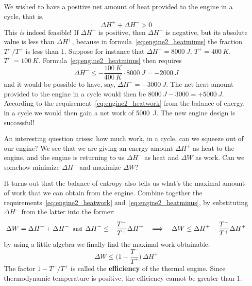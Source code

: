 \documentclass[a4paper,12pt,%
onecolumn,oneside,titlepage,%
british%
]{memoir}
\newcommand*{\incr}{\Delta}%
\renewcommand*{\|}[1][]{\nonscript\:#1\vert\nonscript\:\mathopen{}}
\newcommand*{\yhep}{\incr H^{+}}%
\newcommand*{\yhem}{\incr H^{-}}%
\newcommand*{\yW}{\incr W}%
\newcommand*{\yte}{T}%
\newcommand*{\ytep}{\yte^{+}}%
\newcommand*{\ytem}{\yte^{-}}%
\begin{document}
We wished to have a positive net amount of heat provided to the engine in a cycle, that is,
\begin{equation*}
  \yhep + \yhem > 0
\end{equation*}
This \emph{is} indeed feasible! If $\yhep$ is positive, then $\yhem$ is negative, but its absolute value is less than $\yhep$, because in formula~\eqref{eq:engine2_heatminus} the fraction $\ytem/\ytep$ is less than $1$. Suppose for instance that $\yhep=\qty{8000}{J}$, $\ytep=\qty{400}{K}$, $\ytem=\qty{100}{K}$. Formula~\eqref{eq:engine2_heatminus} then requires
\begin{equation*}
  \yhem \le -\frac{\qty{100}{K}}{\qty{400}{K}}\cdot\qty{8000}{J} = -\qty{2000}{J}
\end{equation*}
and it would be possible to have, say, $\yhem=-\qty{3000}{J}$. The net heat amount provided to the engine in a cycle would then be $\qty{8000}{J}-\qty{3000} = +\qty{5000}{J}$. According to the requirement~\eqref{eq:engine2_heatwork} from the balance of energy, in a cycle we would then gain a net work of \qty{5000}{J}. The new engine design is successful!

\medskip

An interesting question arises: how much work, in a cycle, can we squeeze out of our engine? We see that we are giving an energy amount $\yhep$ as heat to the engine, and the engine is returning to us $\yhem$ as heat and $\yW$ as work. Can we somehow minimize $\yhem$ and maximize $\yW$?

It turns out that the balance of entropy also tells us what's the maximal amount of work that we can obtain from the engine. Combine together the requirements~\eqref{eq:engine2_heatwork} and~\eqref{eq:engine2_heatminus}, by substituting $\yhem$ from the latter into the former:
\begin{equation*}
  \yW = \yhep + \yhem
  \enspace\text{\footnotesize and}\enspace
  \yhem \le -\frac{\ytem}{\ytep}\yhep
\quad\Longrightarrow\quad
  \yW \le \yhep -\frac{\ytem}{\ytep}\yhep
\end{equation*}
by using a little algebra we finally find the maximal work obtainable:
\begin{equation}\label{eq:thermal_efficiency}
  \yW \le \biggl(1-\frac{\ytem}{\ytep}\biggr)\,\yhep
\end{equation}
The factor $1-\ytem/\ytep$ is called the \textbf{efficiency} of the thermal engine. Since thermodynamic temperature is positive, the efficiency cannot be greater than $1$.
\end{document}
